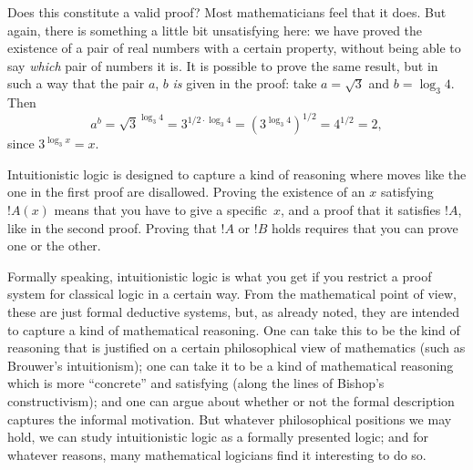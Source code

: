 \documentclass[../../../include/open-logic-chapter]{subfiles}
\begin{document}
Does this constitute a valid proof? Most mathematicians feel that it
does. But again, there is something a little bit unsatisfying here: we
have proved the existence of a pair of real numbers with a certain
property, without being able to say \emph{which} pair of numbers it
is.  It is possible to prove the same result, but in such a way that
the pair $a$, $b$ \emph{is} given in the proof: take $a = \sqrt{3}$
and $b = \log_3 4$. Then
\[
a^b = \sqrt{3}^{\log_3 4} = 3^{1/2 \cdot \log_3 4} = (3^{\log_3
  4})^{1/2} = 4^{1/2}= 2,
\]
since $3^{\log_3 x} = x$.

Intuitionistic logic is designed to capture a kind of reasoning where
moves like the one in the first proof are disallowed. Proving the
existence of an $x$ satisfying~$!A(x)$ means that you have to give a
specific~$x$, and a proof that it satisfies $!A$, like in the second
proof. Proving that $!A$ or $!B$ holds requires that you can prove one
or the other.

Formally speaking, intuitionistic logic is what you get if
you restrict a proof system for classical logic in a certain
way. From the mathematical point of view, these are
just formal deductive systems, but, as already noted, they are
intended to capture a kind of mathematical reasoning. One can take this
to be the kind of reasoning that is justified on a certain
philosophical view of mathematics (such as Brouwer's intuitionism);
one can take it to be a kind of mathematical reasoning which is more
``concrete'' and satisfying (along the lines of Bishop's
constructivism); and one can argue about whether or not the formal
description captures the informal motivation. But whatever
philosophical positions we may hold, we can study intuitionistic logic
as a formally presented logic; and for whatever reasons, many
mathematical logicians find it interesting to do so.
\end{document}
